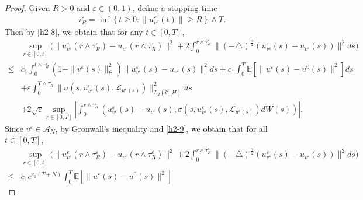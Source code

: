 \documentclass[11pt]{article}
\numberwithin{equation}{section}
\theoremstyle{plain}
\def\geq{\geqslant}
\def\leq{\leqslant}
\begin{document}
\begin{proof}
    Given $R>0$ and $\varepsilon \in (0,1)$,  define a stopping time
    \begin{align*}
        \tau_R^\varepsilon
        = \inf
        \left\{ t \geq 0: \| u_{v^\varepsilon}^\varepsilon(t) \| \geq R
        \right\} \wedge T.
    \end{align*}
    Then by \eqref{h2-8}, we obtain that for any $t \in [0,T]$,
    \begin{align}\label{h2-9}
        & \sup_{r\in [0,t]}
        \Big(
        \| u_{v^\varepsilon}^\varepsilon(r \wedge \tau_R^\varepsilon) - u_{v^\varepsilon}(r \wedge \tau_R^\varepsilon) \|^2
        + 2 \int_0^{r \wedge \tau_R^\varepsilon}
        \| (-\triangle)^{\frac{\alpha}{2}}
        \left( u_{v^\varepsilon}^\varepsilon (s)
        - u_{v^\varepsilon}(s)
        \right)
        \|^2 ds
        \Big) \nonumber \\
        \leq & c_1
        \int_0^{t \wedge \tau_R^\varepsilon}
        \left( 1
        + \| v^\varepsilon(s) \|^2
        _{l^2} \right)
        \| u_{v^\varepsilon}^\varepsilon(s)
        - u_{v^\varepsilon}(s) \|^2
        ds
        + c_1
        \int_0^{T} \mathbb{E} \left[ \| u^\varepsilon(s) - u^0(s) \|^2 \right] ds
        \nonumber \\
        & + \varepsilon \int_{0}^{T \wedge \tau_R^\varepsilon}
        \| \sigma(s, u_{v^\varepsilon}^\varepsilon(s), \mathcal{L}_{u^\varepsilon(s)}) \|^2_{L_2(l^2, H)} ds
        \nonumber \\
        & + 2 \sqrt{\varepsilon}
        \sup_{r \in [0,T]}
        \left| \int_{0}^{r \wedge \tau_R^\varepsilon}
        \left( u_{v^\varepsilon}^\varepsilon(s) - u_{v^\varepsilon}(s),
        \sigma(s, u_{v^\varepsilon}^\varepsilon(s), \mathcal{L}_{u^\varepsilon(s)} ) dW(s)
        \right)
        \right|.
    \end{align}
    Since $v^\varepsilon\in \mathcal{A}_N$,
    by Gronwall's inequality and \eqref{h2-9}, we obtain
    that for all  $t \in [0,T]$,
    \begin{align}\label{h2-10}
        & \sup_{r \in [0,t]}
        \Big(
        \| u_{v^\varepsilon}^\varepsilon(r \wedge \tau_R^\varepsilon) - u_{v^\varepsilon}(r \wedge \tau_R^\varepsilon) \|^2
        + 2 \int_0^{r \wedge \tau_R^\varepsilon}
        \| (-\triangle)^{\frac{\alpha}{2}}
        \left( u_{v^\varepsilon}^\varepsilon (s)
        - u_{v^\varepsilon}(s)
        \right)
        \|^2 ds
        \Big) \nonumber \\
        \leq &
        c_1 e^{
            c_1 (T +N )  }
        \int_0^T \mathbb{E} \left[ \| u^\varepsilon(s) - u^0(s) \|^2 \right]

\end{align}
\end{proof}
\end{document}
